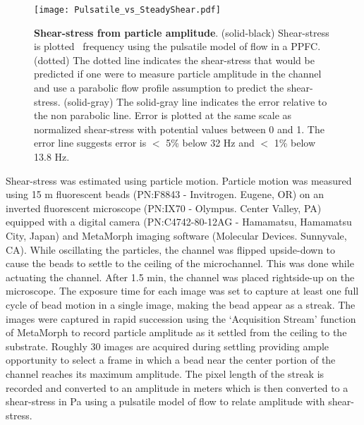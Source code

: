 \begin{figure}[!ht]
\centering
\texttt{[image: Pulsatile\_vs\_SteadyShear.pdf]}
\caption{\textbf{Shear-stress from particle amplitude}. (solid-black) Shear-stress is plotted \vs\ frequency using the pulsatile model of flow in a PPFC. (dotted) The dotted line indicates the shear-stress that would be predicted if one were to measure particle amplitude in the channel and use a parabolic flow profile assumption to predict the shear-stress. (solid-gray) The solid-gray line indicates the error relative to the non parabolic line. Error is plotted at the same scale as normalized shear-stress with potential values between 0 and 1. The error line suggests error is $<$ 5\% below 32 Hz and $<$ 1\% below 13.8 Hz.}
\label{Chap:Oscillator:fig:amplitudeMeasurements}
\end{figure}

Shear-stress was estimated using particle motion. Particle motion was measured using 15 \textmu m fluorescent beads (PN:F8843 - Invitrogen. Eugene, OR) on an inverted fluorescent microscope (PN:IX70 - Olympus. Center Valley, PA) equipped with a digital camera (PN:C4742-80-12AG - Hamamatsu, Hamamatsu City, Japan) and MetaMorph imaging software (Molecular Devices. Sunnyvale, CA). While oscillating the particles, the channel was flipped upside-down to cause the beads to settle to the ceiling of the microchannel. This was done while actuating the channel. After 1.5 min, the channel was placed rightside-up on the microscope. The exposure time for each image was set to capture at least one full cycle of bead motion in a single image, making the bead appear as a streak. The images were captured in rapid succession using the `Acquisition Stream' function of MetaMorph to record particle amplitude as it settled from the ceiling to the substrate. Roughly 30 images are acquired during settling providing ample opportunity to select a frame in which a bead near the center portion of the channel reaches its maximum amplitude. The pixel length of the streak is recorded and converted to an amplitude in meters which is then converted to a shear-stress in Pa using a pulsatile model of flow to relate amplitude with shear-stress.

